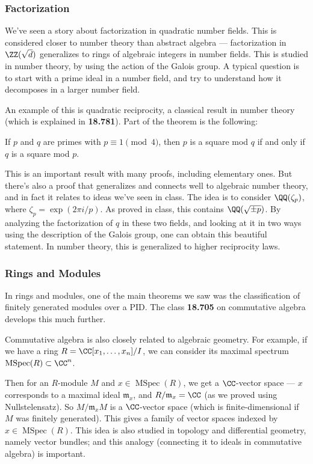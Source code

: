 \subsubsection{Factorization} 

We've seen a story about factorization in quadratic number fields. This is considered closer to number theory than abstract algebra --- factorization in $\ZZ(\sqrt{d})$ generalizes to rings of algebraic integers in number fields. This is studied in number theory, by using the action of the Galois group. A typical question is to start with a prime ideal in a number field, and try to understand how it decomposes in a larger number field. 

An example of this is quadratic reciprocity, a classical result in number theory (which is explained in \textbf{18.781}). Part of the theorem is the following:
\begin{example}
If $p$ and $q$ are primes with $p \equiv 1 \pmod{4}$, then $p$ is a square mod $q$ if and only if $q$ is a square mod $p$.
\end{example}

This is an important result with many proofs, including elementary ones. But there's also a proof that generalizes and connects well to algebraic number theory, and in fact it relates to ideas we've seen in class. The idea is to consider $\QQ(\zeta_p)$, where $\zeta_p = \exp(2\pi i/p)$. As proved in class, this contains $\QQ(\sqrt{\pm p})$. By analyzing the factorization of $q$ in these two fields, and looking at it in two ways using the description of the Galois group, one can obtain this beautiful statement. In number theory, this is generalized to higher reciprocity laws. 

\subsubsection{Rings and Modules}

In rings and modules, one of the main theorems we saw was the classification of finitely generated modules over a PID. The class \textbf{18.705} on commutative algebra develops this much further. 

Commutative algebra is also closely related to algebraic geometry. For example, if we have a ring $R = \CC[x_1, \ldots, x_n]/I$, we can consider its maximal spectrum $\operatorname{MSpec}(R) \subset \CC^n$. 

Then for an $R$-module $M$ and $x \in \operatorname{MSpec}(R)$, we get a $\CC$-vector space --- $x$ corresponds to a maximal ideal $\mathfrak{m}_x$, and $R/\mathfrak{m}_x = \CC$ (as we proved using Nullstelensatz). So $M/\mathfrak{m}_xM$ is a $\CC$-vector space (which is finite-dimensional if $M$ was finitely generated). This gives a family of vector spaces indexed by $x \in \operatorname{MSpec}(R)$. This idea is also studied in topology and differential geometry, namely vector bundles; and this analogy (connecting it to ideals in commutative algebra) is important. 

